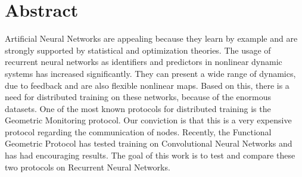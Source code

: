 \chapter*{Abstract}

Artificial Neural Networks are appealing because they learn by example and are strongly supported by statistical and optimization theories.
The usage of recurrent neural networks as identifiers and predictors in nonlinear dynamic systems has increased significantly.
They can present a wide range of dynamics, due to feedback and are also flexible nonlinear maps.
Based on this, there is a need for distributed training on these networks, because of the enormous datasets.
One of the most known protocols for distributed training is the Geometric Monitoring protocol.
Our conviction is that this is a very expensive protocol regarding the communication of nodes.
Recently, the Functional Geometric Protocol has tested training on Convolutional Neural Networks and has had encouraging results.
The goal of this work is to test and compare these two protocols on Recurrent Neural Networks.